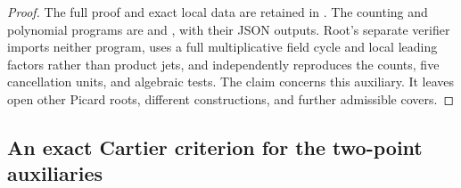 \begin{proof}
The full proof and exact local data are retained in
.
The counting and polynomial programs are
 and
,
with their JSON outputs. Root's separate verifier
imports neither program, uses a full multiplicative
field cycle and local leading factors rather than
product jets, and independently reproduces the
counts, five cancellation units, and algebraic tests.
The claim concerns this auxiliary. It leaves open
other Picard roots, different constructions, and
further admissible covers.
\end{proof}

\subsection{An exact Cartier criterion for the two-point auxiliaries}

